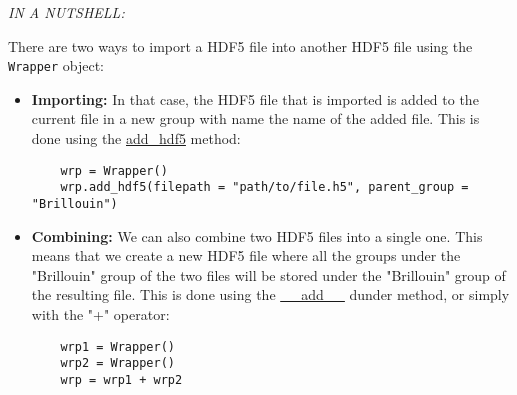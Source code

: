 \begin{tcolorbox}
    \textit{IN A NUTSHELL:}

    There are two ways to import a HDF5 file into another HDF5 file using the \texttt{Wrapper} object:
    \begin{itemize}
        \item \textbf{Importing:} In that case, the HDF5 file that is imported is added to the current file in a new group with name the name of the added file. This is done using the \hyperref[subsec:wrapper.add_hdf5]{add\_hdf5} method:
\begin{lstlisting}
    wrp = Wrapper()
    wrp.add_hdf5(filepath = "path/to/file.h5", parent_group = "Brillouin")
\end{lstlisting}
    \end{itemize}
\end{tcolorbox}

\begin{tcolorbox}
    \begin{itemize}
        \item \textbf{Combining:} We can also combine two HDF5 files into a single one. This means that we create a new HDF5 file where all the groups under the "Brillouin" group of the two files will be stored under the "Brillouin" group of the resulting file. This is done using the \hyperref[subsec:wrapper.__add__]{\_\_add\_\_} dunder method, or simply with the "+" operator:
\begin{lstlisting}
    wrp1 = Wrapper()
    wrp2 = Wrapper()
    wrp = wrp1 + wrp2
\end{lstlisting}
    \end{itemize}
\end{tcolorbox}
    
